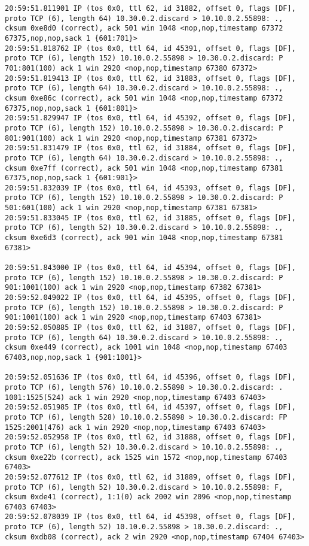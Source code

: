 \documentclass[a4paper,12pt]{article}
\begin{document}
\begin{lstlisting}
20:59:51.811901 IP (tos 0x0, ttl 62, id 31882, offset 0, flags [DF], proto TCP (6), length 64) 10.30.0.2.discard > 10.10.0.2.55898: ., cksum 0xe8d0 (correct), ack 501 win 1048 <nop,nop,timestamp 67372 67375,nop,nop,sack 1 {601:701}>
20:59:51.818762 IP (tos 0x0, ttl 64, id 45391, offset 0, flags [DF], proto TCP (6), length 152) 10.10.0.2.55898 > 10.30.0.2.discard: P 701:801(100) ack 1 win 2920 <nop,nop,timestamp 67380 67372>
20:59:51.819413 IP (tos 0x0, ttl 62, id 31883, offset 0, flags [DF], proto TCP (6), length 64) 10.30.0.2.discard > 10.10.0.2.55898: ., cksum 0xe86c (correct), ack 501 win 1048 <nop,nop,timestamp 67372 67375,nop,nop,sack 1 {601:801}>
20:59:51.829947 IP (tos 0x0, ttl 64, id 45392, offset 0, flags [DF], proto TCP (6), length 152) 10.10.0.2.55898 > 10.30.0.2.discard: P 801:901(100) ack 1 win 2920 <nop,nop,timestamp 67381 67372>
20:59:51.831479 IP (tos 0x0, ttl 62, id 31884, offset 0, flags [DF], proto TCP (6), length 64) 10.30.0.2.discard > 10.10.0.2.55898: ., cksum 0xe7ff (correct), ack 501 win 1048 <nop,nop,timestamp 67381 67375,nop,nop,sack 1 {601:901}>
20:59:51.832039 IP (tos 0x0, ttl 64, id 45393, offset 0, flags [DF], proto TCP (6), length 152) 10.10.0.2.55898 > 10.30.0.2.discard: P 501:601(100) ack 1 win 2920 <nop,nop,timestamp 67381 67381>
20:59:51.833045 IP (tos 0x0, ttl 62, id 31885, offset 0, flags [DF], proto TCP (6), length 52) 10.30.0.2.discard > 10.10.0.2.55898: ., cksum 0xe6d3 (correct), ack 901 win 1048 <nop,nop,timestamp 67381 67381>

20:59:51.843000 IP (tos 0x0, ttl 64, id 45394, offset 0, flags [DF], proto TCP (6), length 152) 10.10.0.2.55898 > 10.30.0.2.discard: P 901:1001(100) ack 1 win 2920 <nop,nop,timestamp 67382 67381>
20:59:52.049022 IP (tos 0x0, ttl 64, id 45395, offset 0, flags [DF], proto TCP (6), length 152) 10.10.0.2.55898 > 10.30.0.2.discard: P 901:1001(100) ack 1 win 2920 <nop,nop,timestamp 67403 67381>
20:59:52.050885 IP (tos 0x0, ttl 62, id 31887, offset 0, flags [DF], proto TCP (6), length 64) 10.30.0.2.discard > 10.10.0.2.55898: ., cksum 0xe449 (correct), ack 1001 win 1048 <nop,nop,timestamp 67403 67403,nop,nop,sack 1 {901:1001}>

20:59:52.051636 IP (tos 0x0, ttl 64, id 45396, offset 0, flags [DF], proto TCP (6), length 576) 10.10.0.2.55898 > 10.30.0.2.discard: . 1001:1525(524) ack 1 win 2920 <nop,nop,timestamp 67403 67403>
20:59:52.051985 IP (tos 0x0, ttl 64, id 45397, offset 0, flags [DF], proto TCP (6), length 528) 10.10.0.2.55898 > 10.30.0.2.discard: FP 1525:2001(476) ack 1 win 2920 <nop,nop,timestamp 67403 67403>
20:59:52.052958 IP (tos 0x0, ttl 62, id 31888, offset 0, flags [DF], proto TCP (6), length 52) 10.30.0.2.discard > 10.10.0.2.55898: ., cksum 0xe22b (correct), ack 1525 win 1572 <nop,nop,timestamp 67403 67403>
20:59:52.077612 IP (tos 0x0, ttl 62, id 31889, offset 0, flags [DF], proto TCP (6), length 52) 10.30.0.2.discard > 10.10.0.2.55898: F, cksum 0xde41 (correct), 1:1(0) ack 2002 win 2096 <nop,nop,timestamp 67403 67403>
20:59:52.078039 IP (tos 0x0, ttl 64, id 45398, offset 0, flags [DF], proto TCP (6), length 52) 10.10.0.2.55898 > 10.30.0.2.discard: ., cksum 0xdb08 (correct), ack 2 win 2920 <nop,nop,timestamp 67404 67403>


\end{lstlisting}
\end{document}
